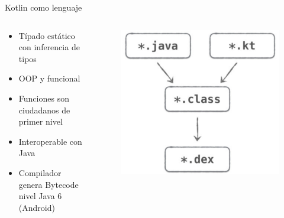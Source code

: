 \documentclass[aspectratio=169]{beamer}
\begin{document}
\begin{frame}[fragile]{Kotlin como lenguaje}
    \begin{columns}
        \begin{column}{0.5\textwidth}
            \begin{itemize}
                \item Típado estático con inferencia de tipos
                \item OOP y funcional
                \item Funciones son ciudadanos de primer nivel
                \item Interoperable con Java
                \item Compilador genera Bytecode nivel Java 6 (Android)
            \end{itemize}
        \end{column}
        \begin{column}{0.5\textwidth}  %
            \begin{figure}
                \centering
                \includegraphics[width=0.8\linewidth]{Images/compile}
            \end{figure}
        \end{column}
    \end{columns}

\end{frame}
\end{document}
